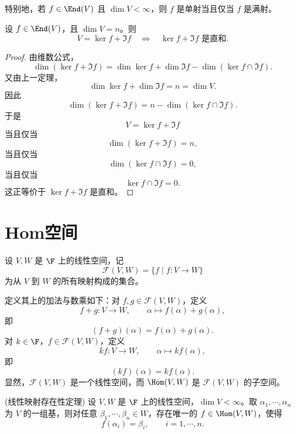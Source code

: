 特别地，若 $f\in\End(V)$ 且 $\dim V<\infty$，则 $f$ 是单射当且仅当 $f$ 是满射。

\begin{proposition}
	设 $f\in\End(V)$，且 $\dim V=n$。则
	\[
	V=\ker f+\Im f
	\quad\Longleftrightarrow\quad
	\ker f+\Im f\text{ 是直和}.
	\]
\end{proposition}

\begin{proof}
	由维数公式，
	\[
	\dim(\ker f+\Im f)
	=\dim\ker f+\dim\Im f
	-\dim(\ker f\cap\Im f).
	\]
	又由上一定理，
	\[
	\dim\ker f+\dim\Im f=n=\dim V.
	\]
	因此
	\[
	\dim(\ker f+\Im f)
	=n-\dim(\ker f\cap\Im f).
	\]
	于是
	\[
	V=\ker f+\Im f
	\]
	当且仅当
	\[
	\dim(\ker f+\Im f)=n,
	\]
	当且仅当
	\[
	\dim(\ker f\cap\Im f)=0,
	\]
	当且仅当
	\[
	\ker f\cap\Im f=0.
	\]
	这正等价于 $\ker f+\Im f$ 是直和。
\end{proof}

\section{Hom空间}

\begin{definition}\label{p1:concept:c4-l1707}
	设 $V,W$ 是 $\F$ 上的线性空间，记
	\[
	\mathcal{F}(V,W)=\{f\mid f:V\longrightarrow W\}
	\]
	为从 $V$ 到 $W$ 的所有映射构成的集合。
	
	定义其上的加法与数乘如下：对 $f,g\in\mathcal{F}(V,W)$，定义
	\[
	f+g:V\longrightarrow W,
	\qquad
	\alpha\longmapsto f(\alpha)+g(\alpha),
	\]
	即
	\[
	(f+g)(\alpha)=f(\alpha)+g(\alpha).
	\]
	对 $k\in\F$，$f\in\mathcal{F}(V,W)$，定义
	\[
	kf:V\longrightarrow W,
	\qquad
	\alpha\longmapsto kf(\alpha),
	\]
	即
	\[
	(kf)(\alpha)=k f(\alpha).
	\]
	显然，$\mathcal{F}(V,W)$ 是一个线性空间，而
	$\Hom(V,W)$ 是 $\mathcal{F}(V,W)$ 的子空间。
\end{definition}

\begin{theorem}(线性映射存在性定理)
	设 $V,W$ 是 $\F$ 上的线性空间，$\dim V<\infty$。取
	$\alpha_1,\cdots,\alpha_n$ 为 $V$ 的一组基，则对任意
	$\beta_1,\cdots,\beta_n\in W$，存在唯一的
	$f\in\Hom(V,W)$，使得
	\[
	f(\alpha_i)=\beta_i,
	\qquad i=1,\cdots,n.
	\]
\end{theorem}

